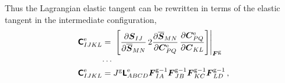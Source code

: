 \documentclass[10pt,letterpaper,oneside]{report}
\newcommand{\ten}[1]{\mbox{\boldmath $#1$}{}}
\newcommand{\tenf}[1]{\mbox{{\sffamily{\bfseries {#1}}}}}
\newcommand{\scas}[1]{\mbox{{\scriptsize{${\rm{#1}}$}}}{}}
\newcommand{\tens}[1]{\mbox{\boldmath{\scriptsize{$#1$}}}{}}
\begin{document}
Thus the Lagrangian elastic tangent can be rewritten in terms of the elastic tangent in the intermediate configuration, 
\begin{align}
\tenf{C}^{\scas{e}}_{IJKL} ={}& \left. \left[ \frac{ \partial \ten{S}_{IJ} }{ \partial \overline{\ten{S}}_{MN} } \, 2 \frac{ \partial \overline{\ten{S}}_{MN} }{ \partial \ten{C}^{\scas{e}}_{PQ} } \, \frac{ \partial \ten{C}^{\scas{e}}_{PQ} }{ \partial \ten{C}_{KL} } \right] \right|_{\tens{F}^{\scas{g}}} 
\\
\cdots{}& \notag \\
\tenf{C}^{\scas{e}}_{IJKL} ={}& J^{\scas{g}} \tenf{L}^{\scas{e}}_{ABCD} \ten{F}^{\scas{g}-1}_{IA} \ten{F}^{\scas{g}-1}_{JB} \ten{F}^{\scas{g}-1}_{KC} \ten{F}^{\scas{g}-1}_{LD} \, , 
\end{align}
\end{document}
